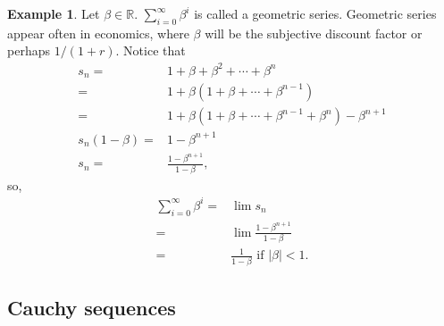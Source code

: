 \documentclass[12pt,reqno]{amsart}
\theoremstyle{definition}
\newtheorem{example}{Example}[section]
\def\R{\mathbb{R}}
\begin{document}
\begin{example}
  Let $\beta \in \R$. $\sum_{i=0}^\infty \beta^i$ is called a
  geometric series. Geometric series appear often in
  economics, where $\beta$ will be the subjective discount factor or
  perhaps $1/(1+r)$.  Notice  that
  \begin{align*}
    s_n = & 1 + \beta + \beta^2 + \cdots + \beta^n \\
    = & 1 + \beta ( 1 + \beta + \cdots + \beta^{n-1} ) \\
    = & 1 + \beta ( 1 + \beta + \cdots + \beta^{n-1} + \beta^n) -
    \beta^{n+1} \\
    s_n(1 - \beta) = & 1 - \beta^{n+1} \\
    s_n = & \frac{1 - \beta^{n+1}}{1-\beta} ,
  \end{align*}
  so, 
  \begin{align*}
    \sum_{i=0}^\infty \beta^i = & \lim s_n \\
    = & \lim \frac{1 - \beta^{n+1}}{1-\beta} \\
    = & \frac{1}{1-\beta} \text{ if } |\beta|<1.
  \end{align*}
\end{example}


\subsection{Cauchy sequences}
\end{document}
